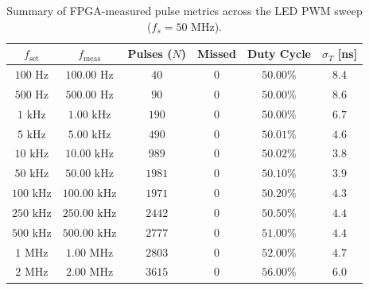 \begin{table}
\centering
\caption{Summary of FPGA-measured pulse metrics across the LED PWM sweep ($f_s = 50\text{ MHz}$).}
\label{tab:led_pwm_results}
\begin{tabular}{cccccc}
\hline
$f_{\text{set}}$ & $f_{\text{meas}}$ & Pulses ($N$) & Missed & Duty Cycle & $\sigma_T$ [ns] \\
\hline
$100\text{ Hz}$  & $100.00\text{ Hz}$  & $40$   & $0$ & $50.00\%$ & $8.4$ \\
$500\text{ Hz}$  & $500.00\text{ Hz}$  & $90$   & $0$ & $50.00\%$ & $8.6$ \\
$1\text{ kHz}$   & $1.00\text{ kHz}$   & $190$  & $0$ & $50.00\%$ & $6.7$ \\
$5\text{ kHz}$   & $5.00\text{ kHz}$   & $490$  & $0$ & $50.01\%$ & $4.6$ \\
$10\text{ kHz}$  & $10.00\text{ kHz}$  & $989$  & $0$ & $50.02\%$ & $3.8$ \\
$50\text{ kHz}$  & $50.00\text{ kHz}$  & $1981$ & $0$ & $50.10\%$ & $3.9$ \\
$100\text{ kHz}$ & $100.00\text{ kHz}$ & $1971$ & $0$ & $50.20\%$ & $4.3$ \\
$250\text{ kHz}$ & $250.00\text{ kHz}$ & $2442$ & $0$ & $50.50\%$ & $4.4$ \\
$500\text{ kHz}$ & $500.00\text{ kHz}$ & $2777$ & $0$ & $51.00\%$ & $4.4$ \\
$1\text{ MHz}$   & $1.00\text{ MHz}$   & $2803$ & $0$ & $52.00\%$ & $4.7$ \\
$2\text{ MHz}$   & $2.00\text{ MHz}$   & $3615$ & $0$ & $56.00\%$ & $6.0$ \\
\hline
\end{tabular}
\end{table}

